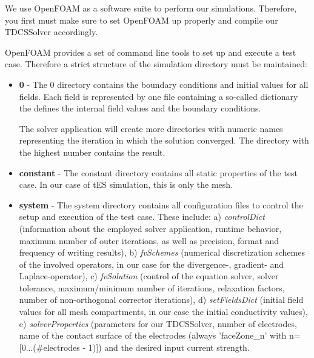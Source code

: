 \hspace{0.5cm}

We use OpenFOAM as a software suite to perform our simulations. Therefore, you first must make sure
to set OpenFOAM up properly and compile our TDCSSolver accordingly.\par
OpenFOAM provides a set of command line tools to set up and execute a test case. Therefore a strict
structure of the simulation directory must be maintained:
\begin{itemize}
    \item \textbf{0} - The 0 directory contains the boundary conditions and initial values for all fields.
                       Each field is represented by one file containing a so-called dictionary the defines
                       the internal field values and the boundary conditions.\par
                       The solver application will create more directories with numeric names representing
                       the iteration in which the solution converged. The directory with the highest number
                       contains the result.
    \item \textbf{constant} - The constant directory contains all static properties of the test case. In our
                              case of tES simulation, this is only the mesh.
    \item \textbf{system} - The system directory contains all configuration files to control the setup and
                            execution of the test case. These include: a) \emph{controlDict} (information about the
                            employed solver application, runtime behavior, maximum number of outer iterations,
                            as well as precision, format and frequency of writing results), b) \emph{fvSchemes}
                            (numerical discretization schemes of the involved operators, in our case for the divergence-,
                            gradient- and Laplace-operator), c) \emph{fvSolution} (control of the equation solver,
                            solver tolerance, maximum/minimum number of iterations, relaxation factors, number
                            of non-orthogonal corrector iterations), d) \emph{setFieldsDict} (initial field values
                            for all mesh compartments, in our case the initial conductivity values), e)
                            \emph{solverProperties} (parameters for our TDCSSolver, number of electrodes, name of
                            the contact surface of the electrodes (always 'faceZone\_n' with 
                            n=[0...(\#electrodes - 1)]) and the desired input current strength. 
\end{itemize}
